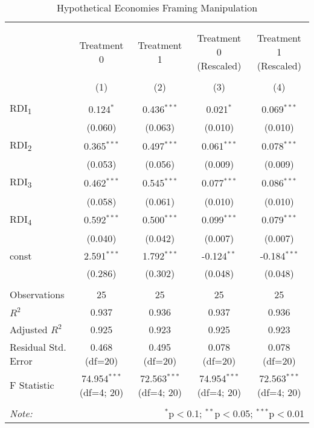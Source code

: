 \begin{table}[!htbp]
\centering
\caption{Hypothetical Economies Framing Manipulation}

\begin{tabular}{@{\extracolsep{5pt}}lcccc}
\\[-1.8ex]\hline
\hline \\[-1.8ex]
\\[-1.8ex] & \multicolumn{1}{c}{Treatment 0} & \multicolumn{1}{c}{Treatment 1} & \multicolumn{1}{c}{Treatment 0 (Rescaled)} & \multicolumn{1}{c}{Treatment 1 (Rescaled)}  \\
\\[-1.8ex] & (1) & (2) & (3) & (4) \\
\hline \\[-1.8ex]
 RDI\textsubscript{1} & 0.124$^{*}$ & 0.436$^{***}$ & 0.021$^{*}$ & 0.069$^{***}$ \\
& (0.060) & (0.063) & (0.010) & (0.010) \\
 RDI\textsubscript{2} & 0.365$^{***}$ & 0.497$^{***}$ & 0.061$^{***}$ & 0.078$^{***}$ \\
& (0.053) & (0.056) & (0.009) & (0.009) \\
 RDI\textsubscript{3} & 0.462$^{***}$ & 0.545$^{***}$ & 0.077$^{***}$ & 0.086$^{***}$ \\
& (0.058) & (0.061) & (0.010) & (0.010) \\
 RDI\textsubscript{4} & 0.592$^{***}$ & 0.500$^{***}$ & 0.099$^{***}$ & 0.079$^{***}$ \\
& (0.040) & (0.042) & (0.007) & (0.007) \\
 const & 2.591$^{***}$ & 1.792$^{***}$ & -0.124$^{**}$ & -0.184$^{***}$ \\
& (0.286) & (0.302) & (0.048) & (0.048) \\
\hline \\[-1.8ex]
 Observations & 25 & 25 & 25 & 25 \\
 $R^2$ & 0.937 & 0.936 & 0.937 & 0.936 \\
 Adjusted $R^2$ & 0.925 & 0.923 & 0.925 & 0.923 \\
 Residual Std. Error & 0.468 (df=20) & 0.495 (df=20) & 0.078 (df=20) & 0.078 (df=20) \\
 F Statistic & 74.954$^{***}$ (df=4; 20) & 72.563$^{***}$ (df=4; 20) & 74.954$^{***}$ (df=4; 20) & 72.563$^{***}$ (df=4; 20) \\
\hline
\hline \\[-1.8ex]
\textit{Note:} & \multicolumn{4}{r}{$^{*}$p$<$0.1; $^{**}$p$<$0.05; $^{***}$p$<$0.01} \\
\end{tabular}
\end{table}